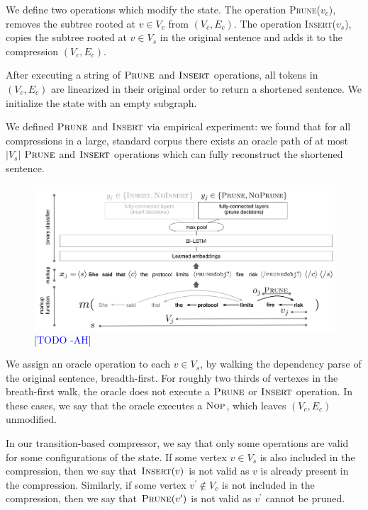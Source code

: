 \documentclass[11pt,a4paper]{article}
\newcommand{\ahcomment}[1]{\textcolor{blue}{[#1 -AH]}}
\begin{document}
We define two operations which modify the state. The operation \textsc{Prune}($v_c$), removes the subtree rooted at $v \in V_c$ from ${(V_c,E_c)}$. The operation \textsc{Insert}($v_s$), copies the subtree rooted at $v \in V_s$ in the original sentence and adds it to the compression ${(V_c,E_c)}$. 

After executing a string of $\textsc{Prune}$ and $\textsc{Insert}$ operations, all tokens in ${(V_c,E_c)}$ are linearized in their original order to return a shortened sentence. We initialize the state with an empty subgraph. 

We defined $\textsc{Prune}$ and $\textsc{Insert}$ via empirical experiment: we found that for all compressions in a large, standard  corpus \cite{filippova2013overcoming} there exists an oracle path of at most $|V_s|$ $\textsc{Prune}$ and $\textsc{Insert}$ operations which can fully reconstruct the shortened sentence. 

\begin{figure}[htb!]
\centering
\includegraphics[width=.75\textwidth]{example.pdf}
\caption{\ahcomment{TODO}}
\label{f:example}
\end{figure}

We assign an oracle operation to each $v \in V_s$, by walking the dependency parse of the original sentence, breadth-first. For roughly two thirds of vertexes in the breath-first walk, the oracle does not execute a $\textsc{Prune}$ or $\textsc{Insert}$ operation. In these cases, we say that the oracle executes a $\textsc{Nop}$, which leaves ${(V_c,E_c)}$ unmodified. 

In our transition-based compressor, we say that only some operations are valid for some configurations of the state. If some vertex $v \in V_s$ is also included in the compression, then we say that $\textsc{Insert}(v)$ is not valid as $v$ is already present in the compression. Similarly, if some vertex $v^{\prime} \notin V_c$ is not included in the compression, then we say that $\textsc{Prune}(v^{\prime})$ is not valid as $v^{\prime}$ cannot be pruned.
\end{document}
